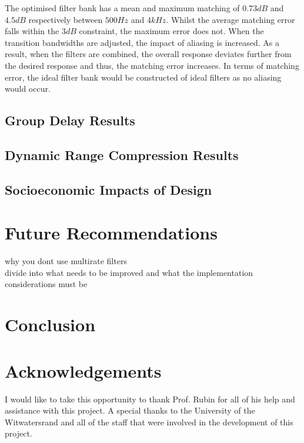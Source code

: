 \documentclass[11pt,onecolumn]{witseiepaper}
\begin{document}
\noindent The optimised filter bank has a mean and maximum matching of $0.73dB$ and $4.5dB$ respectively between $500Hz$ and $4kHz$. Whilst the average matching error falls within the $3dB$ constraint, the maximum error does not. When the transition bandwidths are adjusted, the impact of aliasing is increased. As a result, when the filters are combined, the overall response deviates further from the desired response and thus, the matching error increases. In terms of matching error, the ideal filter bank would be constructed of ideal filters as no aliasing would occur.

\subsection{Group Delay Results}
\label{sec:resGroupDelay}


\subsection{Dynamic Range Compression Results}
\label{sec:resCompress}



\subsection{Socioeconomic Impacts of Design}
\label{sec:socioImpacts}




\section{Future Recommendations}

why you dont use multirate filters\\
divide into what needs to be improved and what the implementation considerations must be
\section{Conclusion}

\section*{Acknowledgements}

\noindent I would like to take this opportunity to thank Prof. Rubin for all of his help and assistance with this project. A special thanks to the University of the Witwatersrand and all of the staff that were involved in the development of this project.
\end{document}

